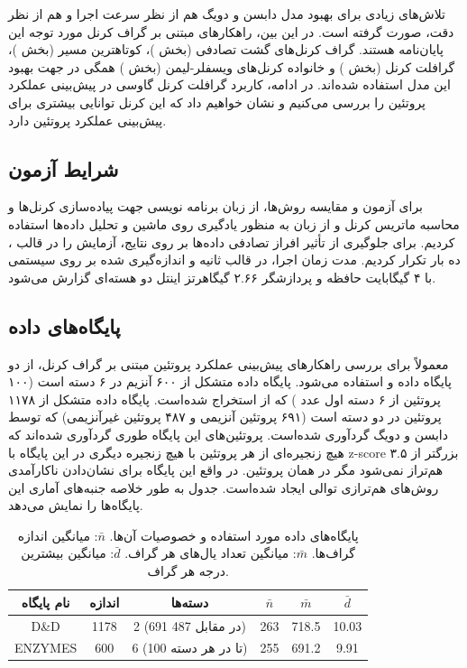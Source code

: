 تلاش‌های زیادی برای بهبود مدل دابسن و دویگ هم از نظر سرعت اجرا و هم از نظر دقت، صورت گرفته است. در این بین، راهکارهای مبتنی بر گراف کرنل مورد توجه این پایان‌نامه هستند. گراف کرنل‌های گشت تصادفی (بخش )، کوتاهترین مسیر (بخش )، گرافلت کرنل (بخش ) و خانواده کرنل‌های ویسفلر-لیمن (بخش ) همگی در جهت بهبود این مدل استفاده شده‌اند. در ادامه، کاربرد گرافلت کرنل گاوسی در پیش‌بینی عملکرد پروتئین را بررسی می‌کنیم و نشان خواهیم داد که این کرنل توانایی بیشتری برای پیش‌بینی عملکرد پروتئین دارد.

\subsection{شرایط آزمون}
برای آزمون و مقایسه روش‌ها، از زبان برنامه نویسی  جهت پیاده‌سازی کرنل‌ها و محاسبه ماتریس کرنل و از زبان  به منظور یادگیری روی ماشین  و تحلیل داده‌ها استفاده کردیم. برای جلوگیری از تأثیر افراز تصادفی داده‌ها بر روی نتایج، آزمایش را در قالب ، ده بار تکرار کردیم. مدت زمان اجرا، در قالب ثانیه و اندازه‌گیری شده بر روی سیستمی با ۴ گیگابایت حافظه و پردازشگر ۲.۶۶ گیگاهرتز اینتل دو هسته‌ای گزارش می‌شود.

\subsection{پایگاه‌های داده}
معمولاً برای بررسی راهکارهای پیش‌بینی عملکرد پروتئین مبتنی بر گراف کرنل، از دو پایگاه داده  و  استفاده می‌شود.  پایگاه داده متشکل از ۶۰۰ آنزیم در ۶ دسته است (۱۰۰ پروتئین از ۶ دسته اول عدد ) که از  استخراج شده‌است.  پایگاه داده متشکل از ۱۱۷۸ پروتئین در دو دسته است (۶۹۱ پروتئین آنزیمی و ۴۸۷ پروتئین غیرآنزیمی) که توسط دابسن و دویگ گردآوری شده‌است. پروتئین‌های این پایگاه طوری گردآوری شده‌اند که هیچ زنجیره‌ای از هر پروتئین با هیچ زنجیره دیگری در این پایگاه با z-score بزرگتر از ۳.۵ هم‌تراز نمی‌شود مگر در همان پروتئین. در واقع این پایگاه برای نشان‌دادن ناکارآمدی روش‌های هم‌ترازی توالی ایجاد شده‌است. جدول  به طور خلاصه جنبه‌های آماری این پایگاه‌ها را نمایش می‌دهد.

\begin{table}[ht]
\centering
\begin{tabular}{| c | c | c | c | c | c |}
    \hline
    نام پایگاه & اندازه & دسته‌ها & $\bar{n}$ & $\bar{m}$ & $\bar{d}$\\[5pt] \hline
    D\&D & 1178 & 2 (691 در مقابل 487) & 263 & 718.5 & 10.03 \\ \hline
    ENZYMES & 600 & 6 (100 تا در هر دسته) & 255 & 691.2 & 9.91 \\ \hline
\end{tabular}
\caption{
    پایگاه‌های داده مورد استفاده و خصوصیات آن‌ها.
 $\bar{n}$: میانگین اندازه گراف‌ها. $\bar{m}$: میانگین تعداد یال‌های هر گراف.  $\bar{d}$: میانگین بیشترین درجه هر گراف.
}
\label{tab:dataset-statistics}
\end{table}

